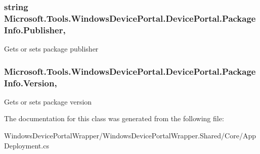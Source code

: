 \subsubsection[{\texorpdfstring{Publisher}{Publisher}}]{\setlength{\rightskip}{0pt plus 5cm}string Microsoft.\+Tools.\+Windows\+Device\+Portal.\+Device\+Portal.\+Package\+Info.\+Publisher\hspace{0.3cm}{\ttfamily [get]}, {\ttfamily [set]}}\hypertarget{class_microsoft_1_1_tools_1_1_windows_device_portal_1_1_device_portal_1_1_package_info_a1ba0070ecf9d281591439f75ce5e7af8}{}\label{class_microsoft_1_1_tools_1_1_windows_device_portal_1_1_device_portal_1_1_package_info_a1ba0070ecf9d281591439f75ce5e7af8}


Gets or sets package publisher 

\subsubsection[{\texorpdfstring{Version}{Version}}]{ Microsoft.\+Tools.\+Windows\+Device\+Portal.\+Device\+Portal.\+Package\+Info.\+Version\hspace{0.3cm}{\ttfamily [get]}, {\ttfamily [set]}}\hypertarget{class_microsoft_1_1_tools_1_1_windows_device_portal_1_1_device_portal_1_1_package_info_a177a04954e10b60a32e747277fd028c6}{}\label{class_microsoft_1_1_tools_1_1_windows_device_portal_1_1_device_portal_1_1_package_info_a177a04954e10b60a32e747277fd028c6}


Gets or sets package version 



The documentation for this class was generated from the following file\+:\begin{DoxyCompactItemize}
\item 
Windows\+Device\+Portal\+Wrapper/\+Windows\+Device\+Portal\+Wrapper.\+Shared/\+Core/App\+Deployment.\+cs\end{DoxyCompactItemize}
